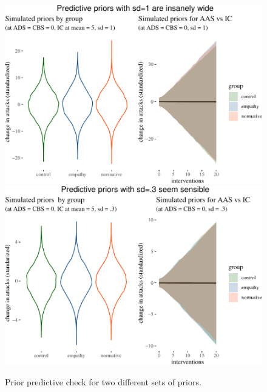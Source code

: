 \documentclass[preprint,12pt]{elsarticle}
\begin{document}
\begin{figure}

\begin{center}\includegraphics[width=0.8\linewidth]{ figures/fig:priorCheck-1} \includegraphics[width=0.8\linewidth]{ figures/fig:priorCheck-2} \end{center}

\caption{Prior predictive check for two different sets of priors.}
\label{fig:priors}
\end{figure}















\end{document}
